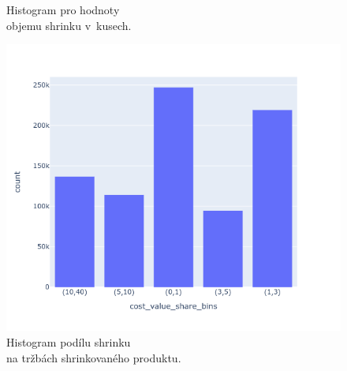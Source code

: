 \begin{figure}[h!]
\begin{minipage}[b]{.55\textwidth}
        \vspace*{-3em}
        \caption{Histogram pro hodnoty \\ objemu shrinku v~kusech.}
        \label{obr:nb:hist2}
    \end{minipage}
    \vspace*{-2em}

\end{figure}


\begin{figure}[h!]
    \centering
    \begin{minipage}[b]{.55\textwidth}
      \centering
      \captionsetup{justification=centering}

      \includegraphics[width=\textwidth]{obrazky/grafy/histogram/newplot.png}
      \vspace*{-3em}
      \caption{Histogram podílu shrinku \\na tržbách shrinkovaného produktu.}
      \label{obr:nb:hist3}
    \end{minipage}%
    \hspace*{-2em}
    \begin{minipage}[b]{.55\textwidth}
        \centering
        \captionsetup{justification=centering}
  

\end{minipage}
\end{figure}
